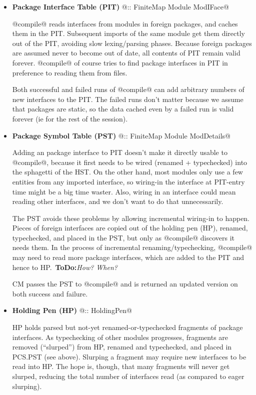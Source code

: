 \documentclass[11pt]{article}
\newcommand{\ToDo}[1]{{{\bf ToDo:}\sl #1}}
\begin{document}
   \begin{itemize}
   \item
      {\bf Package Interface Table (PIT)} @:: FiniteMap Module ModIFace@

   @compile@ reads interfaces from modules in foreign packages, and
   caches them in the PIT.  Subsequent imports of the same module get
   them directly out of the PIT, avoiding slow lexing/parsing phases.
   Because foreign packages are assumed never to become out of date,
   all contents of PIT remain valid forever.  @compile@ of course
   tries to find package interfaces in PIT in preference to reading
   them from files.  

   Both successful and failed runs of @compile@ can add arbitrary
   numbers of new interfaces to the PIT.  The failed runs don't matter
   because we assume that packages are static, so the data cached even
   by a failed run is valid forever (ie for the rest of the session).

   \item
      {\bf Package Symbol Table (PST)} @:: FiniteMap Module ModDetails@

   Adding an package interface to PIT doesn't make it directly usable
   to @compile@, because it first needs to be wired (renamed +
   typechecked) into the sphagetti of the HST.  On the other hand,
   most modules only use a few entities from any imported interface,
   so wiring-in the interface at PIT-entry time might be a big time
   waster.  Also, wiring in an interface could mean reading other
   interfaces, and we don't want to do that unnecessarily.

   The PST avoids these problems by allowing incremental wiring-in to
   happen.  Pieces of foreign interfaces are copied out of the holding
   pen (HP), renamed, typechecked, and placed in the PST, but only as
   @compile@ discovers it needs them.  In the process of incremental
   renaming/typechecking, @compile@ may need to read more package
   interfaces, which are added to the PIT and hence to 
   HP.~\ToDo{How? When?}

   CM passes the PST to @compile@ and is returned an updated version
   on both success and failure.

   \item 
      {\bf Holding Pen (HP)} @:: HoldingPen@ 

   HP holds parsed but not-yet renamed-or-typechecked fragments of
   package interfaces.  As typechecking of other modules progresses,
   fragments are removed (``slurped'') from HP, renamed and
   typechecked, and placed in PCS.PST (see above).  Slurping a
   fragment may require new interfaces to be read into HP.  The hope
   is, though, that many fragments will never get slurped, reducing
   the total number of interfaces read (as compared to eager slurping).

   \end{itemize}
\end{document}
